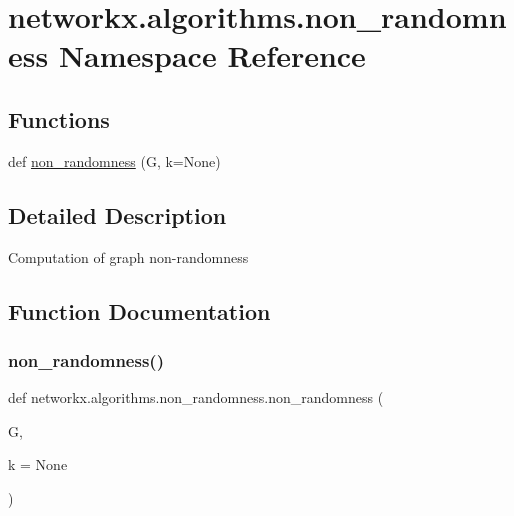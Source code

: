 \hypertarget{namespacenetworkx_1_1algorithms_1_1non__randomness}{}\section{networkx.\+algorithms.\+non\+\_\+randomness Namespace Reference}
\label{namespacenetworkx_1_1algorithms_1_1non__randomness}
\subsection*{Functions}
\begin{DoxyCompactItemize}
\item 
def \hyperlink{namespacenetworkx_1_1algorithms_1_1non__randomness_a5bba8f2869406236965c2c5f302dd7d2}{non\+\_\+randomness} (G, k=None)
\end{DoxyCompactItemize}


\subsection{Detailed Description}
\begin{DoxyVerb}Computation of graph non-randomness
\end{DoxyVerb}
 

\subsection{Function Documentation}
\mbox{\label{namespacenetworkx_1_1algorithms_1_1non__randomness_a5bba8f2869406236965c2c5f302dd7d2}} 
\subsubsection{\texorpdfstring{non\+\_\+randomness()}{non\_randomness()}}
{\footnotesize\ttfamily def networkx.\+algorithms.\+non\+\_\+randomness.\+non\+\_\+randomness (\begin{DoxyParamCaption}\item[{}]{G,  }\item[{}]{k = {\ttfamily None} }\end{DoxyParamCaption})}


